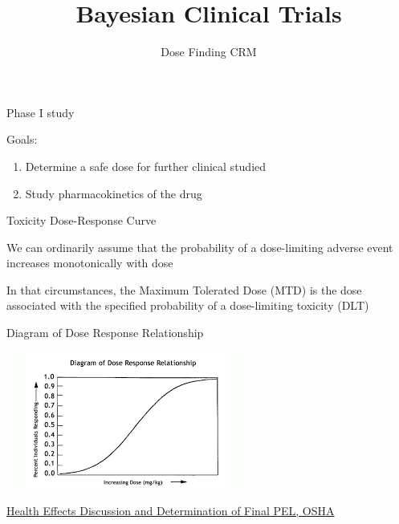 \documentclass{beamer}
\title[]{Bayesian Clinical Trials}
\subtitle{Dose Finding CRM}
\date{}
\begin{document}
\begin{frame}
\titlepage %
\end{frame}


\begin{frame}{Phase I study}

Goals:

\begin{enumerate}
\def\labelenumi{\arabic{enumi}.}
\itemsep1pt\parskip0pt
\item
  Determine a safe dose for further clinical studied
\item
  Study pharmacokinetics of the drug
\end{enumerate}

\end{frame}

\begin{frame}{Toxicity Dose-Response Curve}

We can ordinarily assume that the probability of a dose-limiting adverse
event increases {monotonically} with dose

In that circumstances, the {Maximum Tolerated Dose (MTD)} is the dose
associated with the specified probability of a {dose-limiting toxicity
(DLT)}

\end{frame}

\begin{frame}{Diagram of Dose Response Relationship}

\begin{center}\includegraphics[scale=0.8]{images/Dose-Response.png} \end{center}

\href{https://www.osha.gov/pls/oshaweb/owadisp.show_document?p_id=770\&p_table=preambles}{Health
Effects Discussion and Determination of Final PEL, OSHA}

\end{frame}
\end{document}

